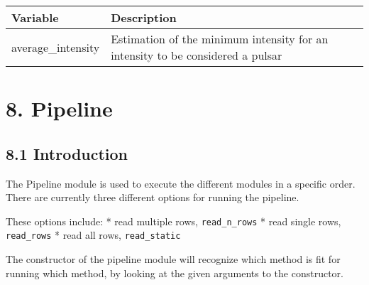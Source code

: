 \documentclass[]{article}
\begin{document}
\begin{longtable}[]{@{}ll@{}}
\toprule
\begin{minipage}[b]{0.41\columnwidth}\raggedright\strut
Variable\strut
\end{minipage} & \begin{minipage}[b]{0.41\columnwidth}\raggedright\strut
Description\strut
\end{minipage}\tabularnewline
\midrule
\endhead
\begin{minipage}[t]{0.41\columnwidth}\raggedright\strut
average\_intensity\strut
\end{minipage} & \begin{minipage}[t]{0.41\columnwidth}\raggedright\strut
Estimation of the minimum intensity for an intensity to be considered a
pulsar\strut
\end{minipage}\tabularnewline
\bottomrule
\end{longtable}

\section{8. Pipeline}\label{pipeline}

\subsection{8.1 Introduction}\label{introduction-1}

The Pipeline module is used to execute the different modules in a
specific order. There are currently three different options for running
the pipeline.

These options include: * read multiple rows, \texttt{read\_n\_rows} *
read single rows, \texttt{read\_rows} * read all rows,
\texttt{read\_static}

The constructor of the pipeline module will recognize which method is
fit for running which method, by looking at the given arguments to the
constructor.
\end{document}
